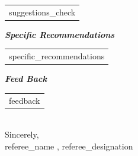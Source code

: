 \documentclass[11pt,a4paper]{letter} %
\begin{document}
\begin{letter}
\begin{center}
\begin{tabular}{  p{13.5cm}  }
   {{suggestions_check}}  \\
    \end{tabular}
\end{center}
\hspace{1.1cm}\textbf{\textit{Specific Recommendations}}
\begin{center}
     \begin{tabular}{  p{13.5cm}  }
  
    {{specific_recommendations}}  \\
    \end{tabular}
\end{center}
\hspace{1.1cm}\textbf{\textit{Feed Back}}
\begin{center}
     \begin{tabular}{  p{13.5cm}  }
  
    {{feedback}}  \\
    \end{tabular}
\end{center}

\closing{} \\

\hspace{10cm}Sincerely,\\ \indent
\hspace{10cm} {{referee_name}} , {{referee_designation}}


\end{letter}
\end{document}
